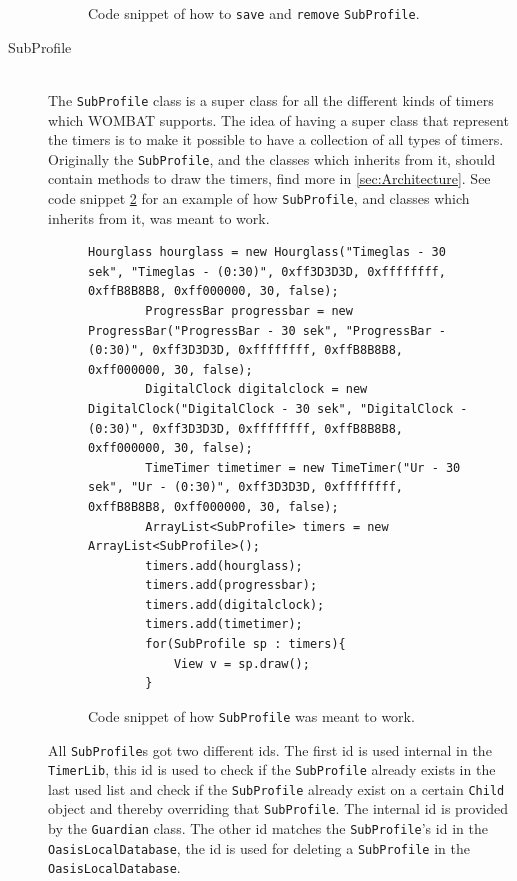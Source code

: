\begin{description}
\begin{figure}[H]
\begin{lstlisting}
\end{lstlisting}
\caption{Code snippet of how to \texttt{save} and \texttt{remove} \texttt{SubProfile}.}%
\label{code:TimerLibSaveRemove}%
\end{figure}

  \item[SubProfile] \hfill \\
  The \texttt{SubProfile} class is a super class for all the different kinds of timers which WOMBAT supports. The idea of having a super class that represent the timers is to make it possible to have a collection of all types of timers. Originally the \texttt{SubProfile}, and the classes which inherits from it, should contain methods to draw the timers, find more in \autoref{sec:Architecture}. See code snippet \ref{code:subprofileexample} for an example of how \texttt{SubProfile}, and classes which inherits from it, was meant to work.
	
\begin{figure}[H]
\begin{lstlisting}
Hourglass hourglass = new Hourglass("Timeglas - 30 sek", "Timeglas - (0:30)", 0xff3D3D3D, 0xffffffff, 0xffB8B8B8, 0xff000000, 30, false);
		ProgressBar progressbar = new ProgressBar("ProgressBar - 30 sek", "ProgressBar - (0:30)", 0xff3D3D3D, 0xffffffff, 0xffB8B8B8, 0xff000000, 30, false);
		DigitalClock digitalclock = new DigitalClock("DigitalClock - 30 sek", "DigitalClock - (0:30)", 0xff3D3D3D, 0xffffffff, 0xffB8B8B8, 0xff000000, 30, false);
		TimeTimer timetimer = new TimeTimer("Ur - 30 sek", "Ur - (0:30)", 0xff3D3D3D, 0xffffffff, 0xffB8B8B8, 0xff000000, 30, false);
		ArrayList<SubProfile> timers = new ArrayList<SubProfile>();
		timers.add(hourglass);
		timers.add(progressbar);
		timers.add(digitalclock);
		timers.add(timetimer);
		for(SubProfile sp : timers){
			View v = sp.draw();
		}
\end{lstlisting}
\caption{Code snippet of how \texttt{SubProfile} was meant to work.}%
\label{code:subprofileexample}%
\end{figure}
	
	All \texttt{SubProfile}s got two different ids. The first id is used internal in the \texttt{TimerLib}, this id is used to check if the \texttt{SubProfile} already exists in the last used list and check if the \texttt{SubProfile} already exist on a certain \texttt{Child} object and thereby overriding that \texttt{SubProfile}. The internal id is provided by the \texttt{Guardian} class. The other id matches the \texttt{SubProfile}'s id in the \texttt{OasisLocalDatabase}, the id is used for deleting a \texttt{SubProfile} in the \texttt{OasisLocalDatabase}.
	

\end{description}
